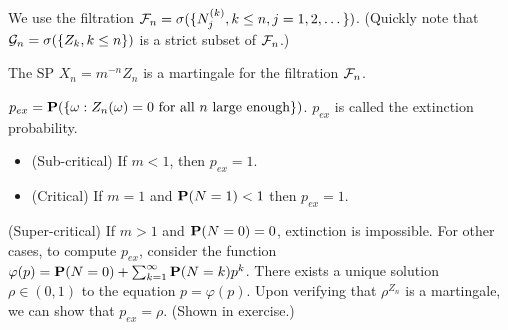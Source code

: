 \begin{remark*} 
We use the filtration $\mathcal{F}_n = \sigma(\{N_j^{(k)}, k \le n, j = 1, 2, \dots\})$.
(Quickly note that $\mathcal{G}_n = \sigma(\{Z_k, k \le n\})$ is a strict subset of
$\mathcal{F}_n$.)
\end{remark*} 

\begin{proposition*} 
The SP $X_n = m^{-n} Z_n$ is a martingale for the filtration $\mathcal{F}_n$.
\end{proposition*} 

\begin{definition*} 
$p_{ex} = \mathbf{P} (\{\omega: Z_n(\omega) = 0 \text{ for all $n$ large enough}\})$.
$p_{ex}$ is called the extinction probability.
\end{definition*} 

\begin{proposition*}
\begin{itemize}
\item (Sub-critical) If $m < 1$, then $p_{ex} = 1$.
\item (Critical) If $m = 1$ and $\mathbf{P}(N = 1) < 1$ then $p_{ex} = 1$.
\end{itemize}
\end{proposition*} 
\begin{proposition*}
(Super-critical)
If $m > 1$ and $\mathbf{P}(N = 0) = 0$, extinction is impossible. For other
cases, to compute $p_{ex}$, consider the function $\varphi(p) = \mathbf{P}(N = 0) +
\sum_{k=1}^\infty \mathbf{P}(N=k) p^k$.  There exists a unique solution $\rho \in (0,
1)$ to the equation $p = \varphi(p)$. Upon verifying that $\rho^{Z_n}$ is a
martingale, we can show that $p_{ex} = \rho$. (Shown in exercise.)
\end{proposition*} 
